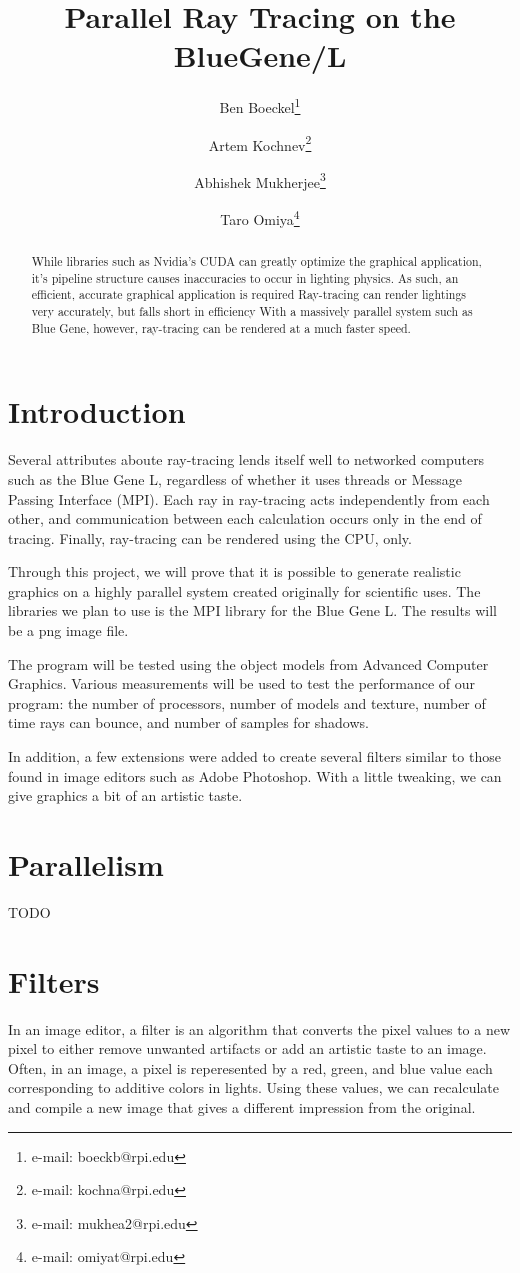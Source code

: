 \documentclass{acmsiggraph}
\title{Parallel Ray Tracing on the BlueGene/L}
\author{%
Ben Boeckel\thanks{e-mail: boeckb@rpi.edu} %
\and Artem Kochnev\thanks{e-mail: kochna@rpi.edu} %
\and Abhishek Mukherjee\thanks{e-mail: mukhea2@rpi.edu} %
\and Taro Omiya\thanks{e-mail: omiyat@rpi.edu}}
\begin{document}
\maketitle


\begin{abstract}
While libraries such as Nvidia's CUDA can greatly optimize the graphical
application, it's pipeline structure causes inaccuracies to occur in lighting
physics.  As such, an efficient, accurate graphical application is required
Ray-tracing can render lightings very accurately, but falls short in efficiency
With a massively parallel system such as Blue Gene, however, ray-tracing can be
rendered at a much faster speed.
\end{abstract}
\keywordlist


\section{Introduction}
Several attributes aboute ray-tracing lends itself well to networked computers
such as the Blue Gene L, regardless of whether it uses threads or Message
Passing Interface (MPI).  Each ray in ray-tracing acts independently from each
other, and communication between each calculation occurs only in the end of
tracing.  Finally, ray-tracing can be rendered using the CPU, only.

Through this project, we will prove that it is possible to generate realistic
graphics on a highly parallel system created originally for scientific uses.
The libraries we plan to use is the MPI library for the Blue Gene L.
The results will be a png image file.

The program will be tested using the object models from Advanced Computer
Graphics.  Various measurements will be used to test the performance of our
program: the number of processors, number of models and texture, number of time
rays can bounce, and number of samples for shadows.

In addition, a few extensions were added to create several filters similar to
those found in image editors such as Adobe Photoshop. With a little tweaking, we
can give graphics a bit of an artistic taste.


\section{Parallelism}
TODO


\section{Filters}
In an image editor, a filter is an algorithm that converts the pixel values to
a new pixel to either remove unwanted artifacts or add an artistic taste to an
image.  Often, in an image, a pixel is reperesented by a red, green, and blue
value each corresponding to additive colors in lights.  Using these values,
we can recalculate and compile a new image that gives a different impression
from the original.
\end{document}
